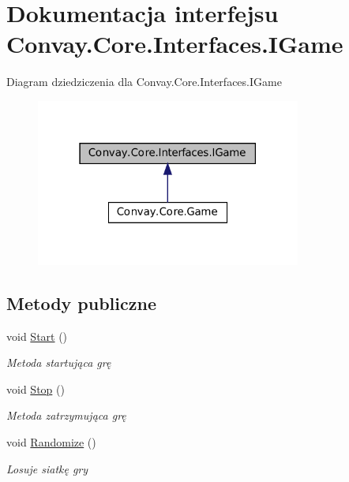 \hypertarget{interface_convay_1_1_core_1_1_interfaces_1_1_i_game}{}\section{Dokumentacja interfejsu Convay.\+Core.\+Interfaces.\+I\+Game}
\label{interface_convay_1_1_core_1_1_interfaces_1_1_i_game}


Diagram dziedziczenia dla Convay.\+Core.\+Interfaces.\+I\+Game
\nopagebreak
\begin{figure}[H]
\begin{center}
\leavevmode
\includegraphics[width=247pt]{interface_convay_1_1_core_1_1_interfaces_1_1_i_game__inherit__graph}
\end{center}
\end{figure}
\subsection*{Metody publiczne}
\begin{DoxyCompactItemize}
\item 
void \hyperlink{interface_convay_1_1_core_1_1_interfaces_1_1_i_game_a76cff5d7173fd5c3b7f7959b0e7baa1b}{Start} ()
\begin{DoxyCompactList}\small\item\em Metoda startująca grę \end{DoxyCompactList}\item 
void \hyperlink{interface_convay_1_1_core_1_1_interfaces_1_1_i_game_a2dec82cc222354ba16ecfa30a0158cac}{Stop} ()
\begin{DoxyCompactList}\small\item\em Metoda zatrzymująca grę \end{DoxyCompactList}\item 
void \hyperlink{interface_convay_1_1_core_1_1_interfaces_1_1_i_game_a782f64a6dd964db6c27752dd9962c1c1}{Randomize} ()
\begin{DoxyCompactList}\small\item\em Losuje siatkę gry \end{DoxyCompactList}\end{DoxyCompactItemize}
